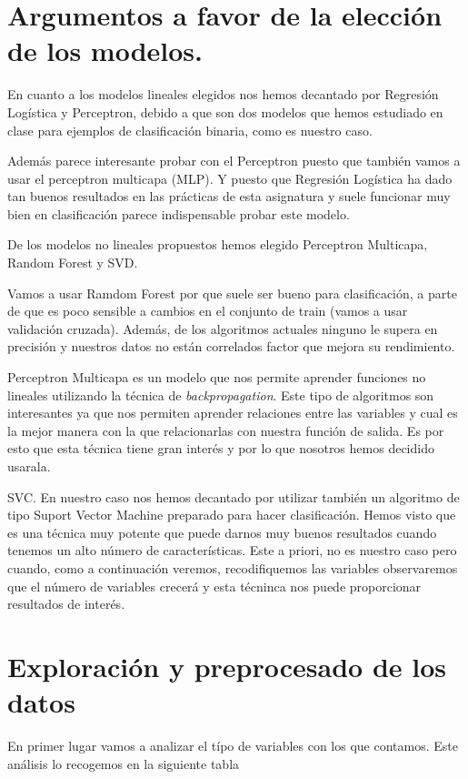 \documentclass[11pt]{article}
\begin{document}
\section{Argumentos a favor de la elección de los modelos.}

En cuanto a los modelos lineales elegidos nos hemos decantado por Regresión
Logística y Perceptron, debido a que son dos modelos que hemos estudiado en
clase para ejemplos de clasificación binaria, como es nuestro caso.  

Además parece interesante probar con el Perceptron puesto que también vamos a
usar el perceptron multicapa (MLP). Y puesto que Regresión Logística ha dado tan
buenos resultados en las prácticas de esta asignatura y suele funcionar muy bien
en clasificación parece indispensable probar este modelo.

De los modelos no lineales propuestos hemos elegido Perceptron Multicapa, Random
Forest y SVD.

Vamos a usar Ramdom Forest por que suele ser bueno para clasificación, a parte
de que es poco sensible a cambios en el conjunto de train (vamos a usar
validación cruzada). Además, de los algoritmos actuales ninguno le supera en
precisión y nuestros datos no están correlados factor que mejora su
rendimiento.

Perceptron Multicapa es un modelo que nos permite aprender funciones no lineales
utilizando la técnica de \textit{backpropagation}. Este tipo de algoritmos son
interesantes ya que nos permiten aprender relaciones entre las variables y cual
es la mejor manera con la que relacionarlas con nuestra función de salida. Es
por esto que esta técnica tiene gran interés y por lo que nosotros hemos
decidido usarala.

SVC. En nuestro caso nos hemos decantado por utilizar también un algoritmo de tipo
Suport Vector Machine preparado para hacer clasificación. Hemos visto que es una 
técnica muy potente que puede darnos muy buenos resultados cuando tenemos un alto 
número de características. Este a priori, no es nuestro caso pero cuando, como a 
continuación veremos, recodifiquemos las variables observaremos que el número 
de variables crecerá y esta técninca nos puede proporcionar resultados de interés.

\section{Exploración y preprocesado de los datos}

En primer lugar vamos a analizar el típo de variables con los que contamos. Este
análisis lo recogemos en la siguiente tabla
\end{document}
